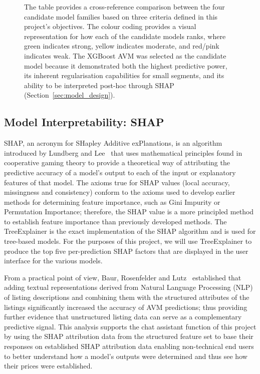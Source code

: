 \begin{figure}[!ht]
{\begin{tikzpicture}
\end{tikzpicture}%
}
\caption[Comparative summary of candidate valuation model families.]{The table provides a cross-reference comparison between the four candidate 
        model families based on three criteria defined in this project's objectives. 
        The colour coding provides a visual representation for how each of the 
        candidate models ranks, where \colorbox{green!22}{green} indicates strong, 
        \colorbox{yellow!28}{yellow} indicates moderate, and \colorbox{red!18}{red/pink} 
        indicates weak. The XGBoost AVM was selected as the candidate model because it 
        demonstrated both the highest predictive power, its inherent regularisation 
        capabilities for small segments, and its ability to be interpreted post-hoc 
        through SHAP (Section~\ref{sec:model_design}).}
\label{fig:model_comparison}
\end{figure}

\subsection{Model Interpretability: SHAP}

SHAP, an acronym for SHapley Additive exPlanations, is an algorithm introduced 
by Lundberg and Lee~\cite{lundberg2017unified} that uses mathematical 
principles found in cooperative gaming theory to provide a theoretical way of 
attributing the predictive accuracy of a model's output to each of the input 
or explanatory features of that model. The axioms true for SHAP values (local 
accuracy, missingness and consistency) conform to the axioms used to develop 
earlier methods for determining feature importance, such as Gini Impurity or 
Permutation Importance; therefore, the SHAP value is a more principled method 
to establish feature importance than previously developed methods. The 
TreeExplainer is the exact implementation of the SHAP algorithm and is used 
for tree-based models. For the purposes of this project, we will use 
TreeExplainer to produce the top five per-prediction SHAP factors that are 
displayed in the user interface for the various models.

From a practical point of view, Baur, Rosenfelder and Lutz~\cite{baur2022automated} 
established that adding textual representations derived from Natural Language 
Processing (NLP) of listing descriptions and combining them with the 
structured attributes of the listings significantly increased the accuracy of 
AVM predictions; thus providing further evidence that unstructured listing 
data can serve as a complementary predictive signal. This analysis supports 
the chat assistant function of this project by using the SHAP attribution 
data from the structured feature set to base their responses on established 
SHAP attribution data enabling non-technical end users to better understand 
how a model's outputs were determined and thus see how their prices were 
established.


